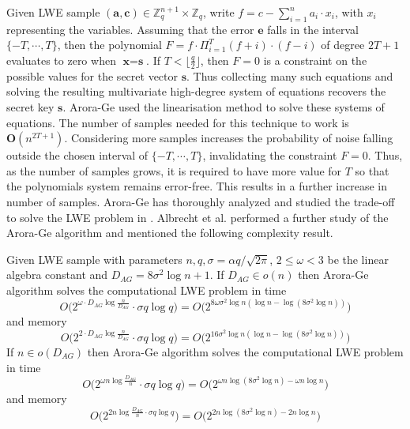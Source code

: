 Given LWE sample $(\textbf{a}, \textbf{c}) \in \mathbb{Z}^{n+1}_q \times \mathbb{Z}_q$, write $f = c - \sum_{i=1}^{n} a_i\cdot x_i$, with $x_i$ representing the variables. Assuming that the error $\textbf{e}$ falls in the interval $\{-T, \cdots , T\}$, then the polynomial $F =f \cdot \Pi_{i=1}^T(f + i) \cdot (f - i)$ of degree $2T + 1$ evaluates to zero when $\textbf{x} = \textbf{s}$. If $T < \lfloor \frac{q}{2} \rfloor$, then $F = 0$ is a constraint on the possible values for the secret vector $\textbf{s}$. Thus collecting many such equations and solving the resulting multivariate high-degree system of equations recovers the secret key $\textbf{s}$. Arora-Ge used the linearisation method to solve these systems of equations. The number of samples needed for this technique to work is $\textbf{O}(n^{2T+1})$. Considering more samples increases the probability of noise falling outside the chosen interval of $\{-T, \cdots, T\}$, invalidating the constraint $F=0$. Thus, as the number of samples grows, it is required to have more value for $T$ so that the polynomials system remains error-free. This results in a further increase in number of samples. Arora-Ge has thoroughly analyzed and studied the trade-off to solve the LWE problem in \cite{arora2011new}. Albrecht et al. \cite{albrecht2014algebraic} performed a further study of the Arora-Ge algorithm and mentioned the following complexity result.

\begin{theorem}
    \cite{albrecht2014algebraic}
    Given LWE sample with parameters $n,q,\sigma=\alpha q/ \sqrt{2\pi}$, $2\leq \omega <3$ be the linear algebra constant and $D_{AG}=8\sigma^2\log{n}+1$.
    If $D_{AG}\in o(n)$ then Arora-Ge algorithm solves the computational LWE problem in time
    \begin{equation*}
        O\Big(2^{\omega\cdot D_{AG}\log{\frac{n}{D_{AG}}}}\cdot \sigma q \log{q} \Big) =O\Big(2^{8\omega\sigma^2\log{n}(\log{n}-\log{(8\sigma^2\log{n})})}\Big)
    \end{equation*}
    and memory
    \begin{equation*}
        O\Big(2^{2\cdot D_{AG}\log{\frac{n}{D_{AG}}}}\cdot \sigma q \log{q} \Big) =O\Big(2^{16\sigma^2\log{n}(\log{n}-\log{(8\sigma^2\log{n})})}\Big)
    \end{equation*}
    If $n\in o(D_{AG})$ then Arora-Ge algorithm solves the computational LWE problem in time
    \begin{equation*}
        O\Big(2^{\omega n \log{\frac{D_{AG}}{n}}}\cdot \sigma q \log{q} \Big) =O\Big(2^{\omega n\log{(8\sigma^2\log{n})}-\omega n \log{n}}\Big)
    \end{equation*}
    and memory
    \begin{equation*}
        O\Big(2^{2n \log{\frac{D_{AG}}{n}}\cdot \sigma q \log{q}} \Big) =O\Big(2^{2n\log{(8\sigma^2\log{n})}-2n\log{n}}\Big)
    \end{equation*}
\end{theorem}

